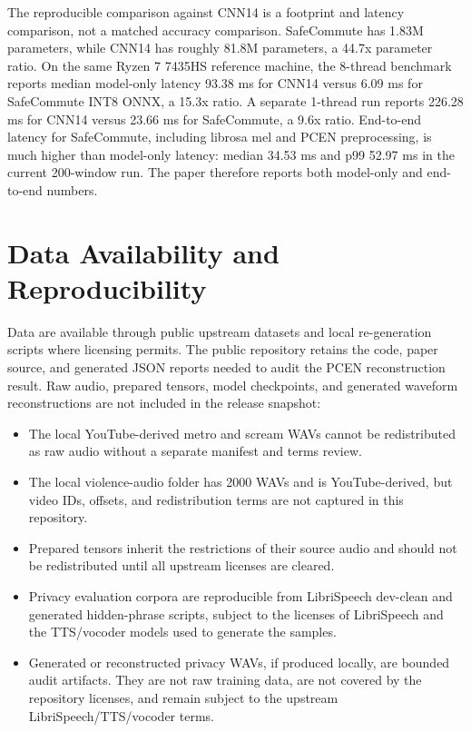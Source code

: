 \documentclass[twocolumn]{article}
\begin{document}
The reproducible comparison against CNN14 is a footprint and latency
comparison, not a matched accuracy comparison. SafeCommute has 1.83M
parameters, while CNN14 has roughly 81.8M parameters, a 44.7x parameter ratio.
On the same Ryzen 7 7435HS reference machine, the 8-thread benchmark reports
median model-only latency 93.38 ms for CNN14 versus 6.09 ms for SafeCommute
INT8 ONNX, a 15.3x ratio. A separate 1-thread run reports 226.28 ms for CNN14
versus 23.66 ms for SafeCommute, a 9.6x ratio. End-to-end latency for
SafeCommute, including librosa mel and PCEN preprocessing, is much higher than
model-only latency: median 34.53 ms and p99 52.97 ms in the current 200-window
run. The paper therefore reports both model-only and end-to-end numbers.

\section{Data Availability and Reproducibility}

Data are available through public upstream datasets and local re-generation scripts where licensing permits. The public repository retains the code, paper source, and generated JSON reports needed to audit the PCEN reconstruction result. Raw audio, prepared tensors, model checkpoints, and generated waveform reconstructions are not included in the release snapshot:

\begin{itemize}
  \item The local YouTube-derived metro and scream WAVs cannot be redistributed
  as raw audio without a separate manifest and terms review.
  \item The local violence-audio folder has 2000 WAVs and is YouTube-derived, but video IDs, offsets, and
  redistribution terms are not captured in this repository.
  \item Prepared tensors inherit the restrictions of their source audio and
  should not be redistributed until all upstream licenses are cleared.
  \item Privacy evaluation corpora are reproducible from LibriSpeech dev-clean
  and generated hidden-phrase scripts, subject to the licenses of LibriSpeech
  and the TTS/vocoder models used to generate the samples.
  \item Generated or reconstructed privacy WAVs, if produced locally, are
  bounded audit artifacts. They are not raw training data, are not covered by
  the repository licenses, and remain subject to the upstream
  LibriSpeech/TTS/vocoder terms.
\end{itemize}
\end{document}
